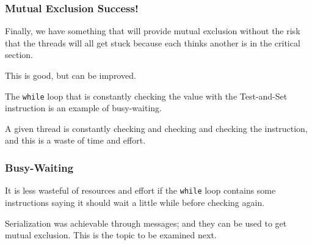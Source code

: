 \begin{frame}
\frametitle{Mutual Exclusion Success!}

Finally, we have something that will provide mutual exclusion without the risk that the threads will all get stuck because each thinks another is in the critical section. 

This is good, but can be improved. 

The \texttt{while} loop that is constantly checking the value with the Test-and-Set instruction is an example of \alert{busy-waiting}.

A given thread is constantly checking and checking and checking the instruction, and this is a waste of time and effort.

\end{frame}

\begin{frame}
\frametitle{Busy-Waiting}

It is less wasteful of resources and effort if the \texttt{while} loop contains some instructions saying it should wait a little while before checking again.

Serialization was achievable through messages; and they can be used to get mutual exclusion. This is the topic to be examined next.


\end{frame}



